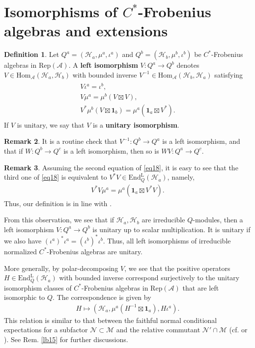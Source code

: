 \documentclass[12pt,a4paper,notitlepage]{article}
\theoremstyle{definition}
\newtheorem{df}{Definition}[section]
\newtheorem{rem}[df]{Remark}
\theoremstyle{plain}
\newcommand{\mc}{\mathcal}
\newcommand{\id}{\mathbf{1}}
\newcommand{\Hom}{\mathrm{Hom}}
\newcommand{\Rep}{\mathrm{Rep}}
\newcommand{\RepA}{\mathrm{Rep}(\mathcal A)}
\newcommand{\EndL}{\mathrm{End}^{\mathrm{L}}}
\numberwithin{equation}{section}
\begin{document}
\section{Isomorphisms of $C^*$-Frobenius algebras and extensions}

\begin{df}\label{lb8}
Let $Q^a=(\mc H_a,\mu^a,\iota^a)$ and $Q^b=(\mc H_b,\mu^b,\iota^b)$ be $C^*$-Frobenius algebras in $\RepA$. A \textbf{left isomorphism} $V:Q^a\rightarrow Q^b$ denotes  $V\in\Hom_{\mc A}(\mc H_a,\mc H_b)$ with bounded inverse $V^{-1}\in\Hom_{\mc A}(\mc H_b,\mc H_a)$ satisfying
\begin{gather}\label{eq18}
	\begin{gathered}
V\iota^a=\iota^b,\\
V\mu^a=\mu^b(V\boxtimes V),\\
V^*\mu^b(V\boxtimes \id_b)=\mu^a(\id_a\boxtimes V^*).
	\end{gathered}
\end{gather}
If $V$ is unitary, we say that $V$ is a \textbf{unitary isomorphism}.
\end{df}

\begin{rem}\label{lb9}
It is a routine check that $V^{-1}:Q^b\rightarrow Q^a$ is a left isomorphism, and that if $W:Q^b\rightarrow Q^c$ is a left isomorphism, then so is $WV:Q^a\rightarrow Q^c$. 
\end{rem}



\begin{rem}
Assuming the second equation of \eqref{eq18}, it is easy to see that the third one of \eqref{eq18} is equivalent to $V^*V\in\EndL_Q(\mc H_a)$, namely,
\begin{align}
V^*V\mu ^a=\mu^a(\id_a\boxtimes V^*V).	
\end{align}
Thus, our definition is in line with \cite[Def. 2.4]{NY18}.

From this observation, we see that if $\mc H_a,\mc H_b$  are irreducible $Q$-modules, then a left isomorphism $V:Q^a\rightarrow Q^b$ is unitary up  to scalar multiplication. It is unitary if we also have $(\iota^a)^*\iota^a=(\iota^b)^*\iota^b$. Thus, all left isomorphisms of irreducible normalized $C^*$-Frobenius algebras are unitary. 

More generally, by polar-decomposing $V$, we see that the  positive operators $H\in\EndL_Q(\mc H_a)$ with bounded inverse correspond surjectively to the unitary isomorphism classes of $C^*$-Frobenius algebras in $\Rep(\mc A)$ that are left isomorphic to $Q$. The correspondence is given by
\begin{align}
H\mapsto (\mc H_a,\mu^a(H^{-1}\boxtimes\id_a),H\iota^a).	
\end{align}
This relation is similar to that between the  faithful normal conditional expectations for a subfactor $\mc N\subset\mc M$ and the relative commutant $\mc N'\cap \mc M$ (cf. \cite{CD75} or \cite[Sec. A.3]{Kos98}). See Rem. \ref{lb15} for further discussions.
\end{rem}
\end{document}

